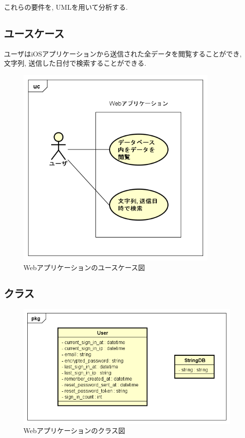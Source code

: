 これらの要件を, UMLを用いて分析する.

\subsection{ユースケース}
ユーザはiOSアプリケーションから送信された全データを閲覧することができ, 文字列, 送信した日付で検索することができる.

\begin{figure}
\begin{center}
\includegraphics[width=10cm]{fig/usecase_web.png}
\end{center}
\caption{Webアプリケーションのユースケース図}
\end{figure}

\subsection{クラス}

\begin{figure}
\begin{center}
\includegraphics[width=13cm]{fig/class_web.png}
\end{center}
\caption{Webアプリケーションのクラス図}
\end{figure}

